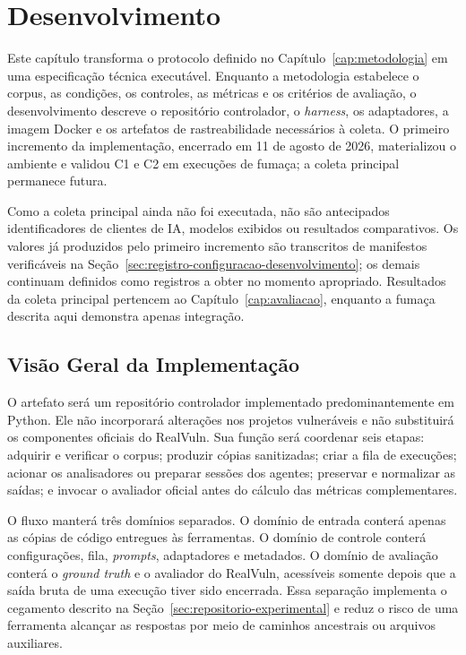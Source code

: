 \chapter{Desenvolvimento}\label{cap:desenvolvimento}

Este capítulo transforma o protocolo definido no Capítulo~\ref{cap:metodologia} em uma especificação técnica executável. Enquanto a metodologia estabelece o corpus, as condições, os controles, as métricas e os critérios de avaliação, o desenvolvimento descreve o repositório controlador, o \textit{harness}, os adaptadores, a imagem Docker e os artefatos de rastreabilidade necessários à coleta. O primeiro incremento da implementação, encerrado em 11 de agosto de 2026, materializou o ambiente e validou C1 e C2 em execuções de fumaça; a coleta principal permanece futura.

Como a coleta principal ainda não foi executada, não são antecipados identificadores de clientes de IA, modelos exibidos ou resultados comparativos. Os valores já produzidos pelo primeiro incremento são transcritos de manifestos verificáveis na Seção~\ref{sec:registro-configuracao-desenvolvimento}; os demais continuam definidos como registros a obter no momento apropriado. Resultados da coleta principal pertencem ao Capítulo~\ref{cap:avaliacao}, enquanto a fumaça descrita aqui demonstra apenas integração.

\section{Visão Geral da Implementação}\label{sec:visao-geral-desenvolvimento}

O artefato será um repositório controlador implementado predominantemente em Python. Ele não incorporará alterações nos projetos vulneráveis e não substituirá os componentes oficiais do RealVuln. Sua função será coordenar seis etapas: adquirir e verificar o corpus; produzir cópias sanitizadas; criar a fila de execuções; acionar os analisadores ou preparar sessões dos agentes; preservar e normalizar as saídas; e invocar o avaliador oficial antes do cálculo das métricas complementares.

O fluxo manterá três domínios separados. O domínio de entrada conterá apenas as cópias de código entregues às ferramentas. O domínio de controle conterá configurações, fila, \textit{prompts}, adaptadores e metadados. O domínio de avaliação conterá o \textit{ground truth} e o avaliador do RealVuln, acessíveis somente depois que a saída bruta de uma execução tiver sido encerrada. Essa separação implementa o cegamento descrito na Seção~\ref{sec:repositorio-experimental} e reduz o risco de uma ferramenta alcançar as respostas por meio de caminhos ancestrais ou arquivos auxiliares.

